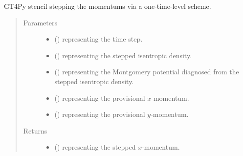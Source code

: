 \documentclass[letterpaper,10pt,english]{sphinxmanual}
\begin{document}
\begin{fulllineitems}

\begin{fulllineitems}
\label{\detokenize{api:dycore.prognostic_isentropic_forward_euler.PrognosticIsentropicForwardEuler._stencil_stepping_by_neglecting_vertical_advection_second_defs}}
GT4Py stencil stepping the momentums via a one-time-level scheme.
\begin{quote}\begin{description}
\item[{Parameters}] \leavevmode\begin{itemize}
\item {} 
 () \textendash{}  representing the time step.

\item {} 
 () \textendash{}  representing the stepped isentropic density.

\item {} 
 () \textendash{}  representing the Montgomery potential diagnosed from the stepped isentropic density.

\item {} 
 () \textendash{}  representing the provisional \(x\)-momentum.

\item {} 
 () \textendash{}  representing the provisional \(y\)-momentum.

\end{itemize}

\item[{Returns}] \leavevmode
\begin{itemize}
\item {} 
 () \textendash{}  representing the stepped \(x\)-momentum.


\end{itemize}
\end{description}
\end{quote}
\end{fulllineitems}
\end{fulllineitems}
\end{document}
